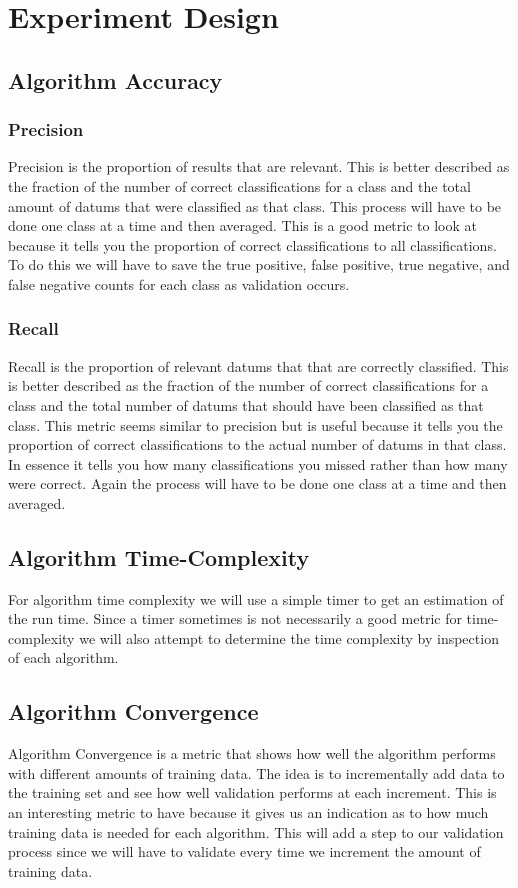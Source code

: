 \documentclass{article}
\begin{document}
	\section{Experiment Design}
		\subsection{Algorithm Accuracy}
			\subsubsection{Precision}
				Precision is the proportion of results that are relevant\cite{ai}. 
				This is better described as the fraction of the number of correct classifications for a class and the total amount of datums that were classified as that class. 
				This process will have to be done one class at a time and then averaged.
				This is a good metric to look at because it tells you the proportion of correct classifications to all classifications. 
				To do this we will have to save the true positive, false positive, true negative, and false negative counts for each class as validation occurs.
			\subsubsection{Recall}
				Recall is the proportion of relevant datums that that are correctly classified. 
				This is better described as the fraction of the number of correct classifications for a class and the total number of datums that should have been classified as that class. 
				This metric seems similar to precision but is useful because it tells you the proportion of correct classifications to the actual number of datums in that class. 
				In essence it tells you how many classifications you missed rather than how many were correct. 
				Again the process will have to be done one class at a time and then averaged. 
		\subsection{Algorithm Time-Complexity}
			For algorithm time complexity we will use a simple timer to get an estimation of the run time. 
			Since a timer sometimes is not necessarily a good metric for time-complexity we will also attempt to determine the time complexity by inspection of each algorithm.
		\subsection{Algorithm Convergence}
			\label{convergence}
			Algorithm Convergence is a metric that shows how well the algorithm performs with different amounts of training data. 
			The idea is to incrementally add data to the training set and see how well validation performs at each increment. 
			This is an interesting metric to have because it gives us an indication as to how much training data is needed for each algorithm. 
			This will add a step to our validation process since we will have to validate every time we increment the amount of training data.


		
	
\end{document}
